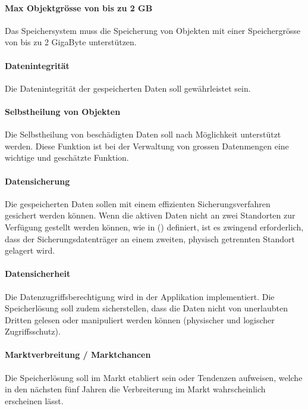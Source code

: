 \paragraph{Max Objektgrösse von bis zu 2 GB}\label{Soll-4-3}
Das Speichersystem muss die Speicherung von Objekten mit einer Speichergrösse von bis zu 2 GigaByte unterstützen.


\renewcommand\theparagraph{Soll-5-\arabic{paragraph}}
\setcounter{paragraph}{0}

\paragraph{Datenintegrität}\label{Soll-5-1}
Die Datenintegrität der gespeicherten Daten soll gewährleistet sein.

\paragraph{Selbstheilung von Objekten}\label{Soll-5-2}
Die Selbstheilung von beschädigten Daten soll nach Möglichkeit unterstützt werden. Diese Funktion ist bei der Verwaltung von grossen Datenmengen eine wichtige und geschätzte Funktion.

\paragraph{Datensicherung}\label{Soll-5-3}
Die gespeicherten Daten sollen mit einem effizienten Sicherungsverfahren gesichert werden können. Wenn die aktiven Daten nicht an zwei Standorten zur Verfügung gestellt werden können, wie in () definiert, ist es zwingend erforderlich, dass der Sicherungsdatenträger an einem zweiten, physisch getrennten Standort gelagert wird.

\paragraph{Datensicherheit}\label{Soll-5-4}
Die Datenzugriffsberechtigung wird in der Applikation implementiert. Die Speicherlösung soll zudem sicherstellen, dass die Daten nicht von unerlaubten Dritten gelesen oder manipuliert werden können (physischer und logischer Zugriffsschutz).


\renewcommand\theparagraph{Soll-6-\arabic{paragraph}}
\setcounter{paragraph}{0}

\paragraph{Marktverbreitung / Marktchancen}\label{Soll-6-1}
Die Speicherlösung soll im Markt etabliert sein oder Tendenzen aufweisen, welche in den nächsten fünf Jahren die Verbreiterung im Markt wahrscheinlich erscheinen lässt.

